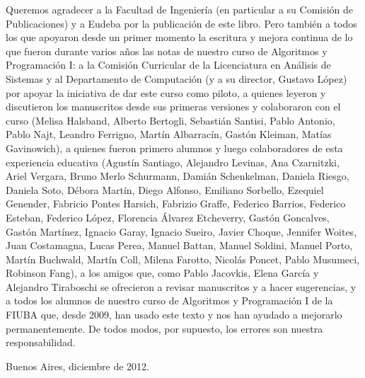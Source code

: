 Queremos agradecer a la Facultad de Ingeniería (en particular a su Comisión de Publicaciones) y a
Eudeba por la publicación de este libro. Pero también a todos los que apoyaron desde un primer momento
la escritura y mejora continua de lo que fueron durante varios años las notas de nuestro curso de
Algoritmos y Programación I: a la Comisión Curricular de la Licenciatura en Análisis de Sistemas y al
Departamento de Computación (y a su director, Gustavo López) por apoyar la iniciativa de dar este curso
como piloto, a quienes leyeron y discutieron los manuscritos desde sus primeras versiones y colaboraron
con el curso (Melisa Halsband, Alberto Bertogli, Sebastián Santisi, Pablo Antonio, Pablo Najt,
Leandro Ferrigno, Martín Albarracín, Gastón Kleiman, Matías Gavinowich), a quienes fueron primero alumnos y
luego colaboradores de esta experiencia educativa
(Agustín Santiago,
Alejandro Levinas,
Ana Czarnitzki,
Ariel Vergara,
Bruno Merlo Schurmann,
Damián Schenkelman,
Daniela Riesgo,
Daniela Soto,
Débora Martín,
Diego Alfonso,
Emiliano Sorbello,
Ezequiel Genender,
Fabricio Pontes Harsich,
Fabrizio Graffe,
Federico Barrios,
Federico Esteban,
Federico López,
Florencia Álvarez Etcheverry,
Gastón Goncalves,
Gastón Martínez,
Ignacio Garay,
Ignacio Sueiro,
Javier Choque,
Jennifer Woites,
Juan Costamagna,
Lucas Perea,
Manuel Battan,
Manuel Soldini,
Manuel Porto,
Martín Buchwald,
Martín Coll,
Milena Farotto,
Nicolás Poncet,
Pablo Musumeci,
Robinson Fang),
a los amigos que, como Pablo Jacovkis, Elena García y Alejandro Tiraboschi se ofrecieron a
revisar manuscritos y a hacer sugerencias, y a todos los alumnos de nuestro curso de Algoritmos y
Programación I de la FIUBA que, desde 2009, han usado este texto y nos han ayudado a mejorarlo permanentemente.
De todos modos, por supuesto, los errores son nuestra responsabilidad.


\hfill Buenos Aires, diciembre de 2012.

